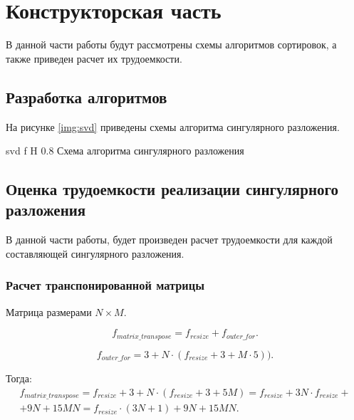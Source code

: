 \chapter{Конструкторская часть}
В данной части работы будут рассмотрены схемы алгоритмов сортировок, а также приведен расчет их трудоемкости.





\section{Разработка алгоритмов}
На рисунке \ref{img:svd} приведены схемы алгоритма сингулярного разложения.

{svd} %
{f} %
{H} %
{0.8\textwidth} %
{Схема алгоритма сингулярного разложения} %






\section{Оценка трудоемкости реализации сингулярного разложения}
В данной части работы, будет произведен расчет трудоемкости для каждой составляющей сингулярного разложения.
\subsection{Расчет транспонированной матрицы}
Матрица размерами $N \times M$.

\begin{equation}
	f_{matrix\_transpose} = f_{resize} + f_{outer\_for}.
\end{equation}

\begin{equation}
	f_{outer\_for} = 3 + N \cdot (f_{resize} + 3 + M \cdot 5)).
\end{equation}

Тогда:
\begin{equation}
	\begin{gathered}
		f_{matrix\_transpose} = f_{resize} + 3 + N \cdot (f_{resize} + 3 + 5M) = f_{resize} + 3N \cdot f_{resize} + \\ + 9N + 15MN= f_{resize} \cdot (3N + 1) + 9N + 15MN.
	\end{gathered}
\end{equation}

